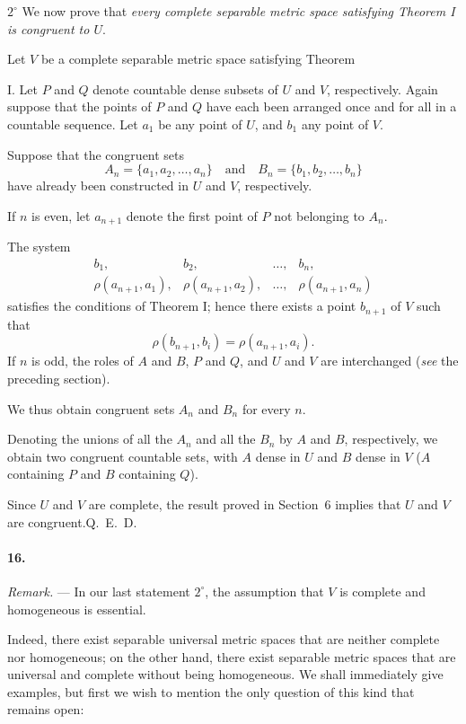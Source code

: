 \documentclass[a4paper,12pt]{amsart}
\newcommand{\srcpage}[1]{} %
\begin{document}
$2^\circ$ We now prove that \textit{every complete separable metric space satisfying Theorem I is congruent to $U$}.

Let $V$ be a complete separable metric space satisfying Theorem
\srcpage{78}
I. Let $P$ and $Q$ denote countable dense subsets of $U$ and $V$, respectively. Again suppose that the points of $P$ and $Q$ have each been arranged once and for all in a countable sequence. Let $a_1$ be any point of $U$, and $b_1$ any point of $V$.

Suppose that the congruent sets
\[
A_n=\{a_1,a_2,\dots,a_n\}\quad\text{and}\quad B_n=\{b_1,b_2,\dots,b_n\}
\]
have already been constructed in $U$ and $V$, respectively.

If $n$ is even, let $a_{n+1}$ denote the first point of $P$ not belonging to $A_n$.

The system
\[
\begin{array}{cccc}
b_1,&b_2,&\dots,&b_n,\\
\rho(a_{n+1},a_1),&\rho(a_{n+1},a_2),&\dots,&\rho(a_{n+1},a_n)
\end{array}
\]
satisfies the conditions of Theorem I; hence there exists a point $b_{n+1}$ of $V$ such that
\[
\rho(b_{n+1},b_i)=\rho(a_{n+1},a_i).
\]
If $n$ is odd, the roles of $A$ and $B$, $P$ and $Q$, and $U$ and $V$ are interchanged (\textit{see} the preceding section).

We thus obtain congruent sets $A_n$ and $B_n$ for every $n$.

Denoting the unions of all the $A_n$ and all the $B_n$ by $A$ and $B$, respectively, we obtain two congruent countable sets, with $A$ dense in $U$ and $B$ dense in $V$ ($A$ containing $P$ and $B$ containing $Q$).

Since $U$ and $V$ are complete, the result proved in Section~6 implies that $U$ and $V$ are congruent.\hfill \mbox{Q. E. D.}

\paragraph{16.}
\textit{Remark.} --- In our last statement $2^\circ$, the assumption that $V$ is complete and homogeneous is essential.

Indeed, there exist separable universal metric spaces that are neither complete nor homogeneous; on the other hand, there exist separable metric spaces that are universal and complete without being homogeneous. We shall immediately give examples, but first we wish to mention the only question of this kind that remains open:
\srcpage{79}
\end{document}
